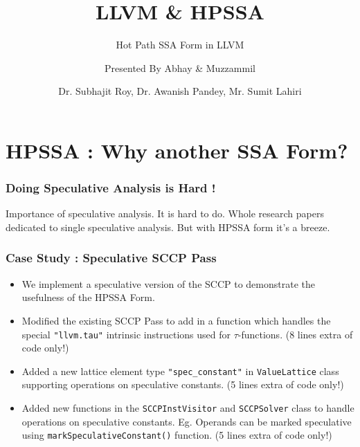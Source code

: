 \documentclass{beamer}
\title[\url{https://google.com}] %
{LLVM \& HPSSA}
\subtitle{Hot Path SSA Form in LLVM}
\author[VIP1 \& VIP2] %
{Presented By Abhay\inst{1} \& Muzzammil\inst{1}}
\institute[IDK] %
{
	\inst{1}%
	IIT Kanpur\\
	PRAISE Group
}
\date[01/03/2022] %
{Dr. Subhajit Roy, Dr. Awanish Pandey, Mr. Sumit Lahiri}
\begin{document}
\frame{\titlepage}

\footnotesize
\section{HPSSA : Why another SSA Form?}

\begin{frame}
	\frametitle{Doing Speculative Analysis is Hard !}
	Importance of speculative analysis. It is hard to do. Whole research papers dedicated to 
	single speculative analysis. But with HPSSA form it's a breeze.
\end{frame}
{
	
}
\begin{frame}
	\frametitle{Case Study : Speculative SCCP Pass}
	\begin{itemize}
		\item We implement a speculative version of the SCCP to demonstrate the usefulness of the HPSSA Form.
		\item Modified the existing SCCP Pass to add in a function which handles the special \texttt{"llvm.tau"} intrinsic instructions used for $\tau$-functions. \color{blue} (8 lines extra of code only!) \color{black}
		\item Added a new lattice element type \texttt{"spec_constant"} in \texttt{ValueLattice} class supporting operations on speculative constants. \color{blue} (5 lines extra of code only!) \color{black} 
		\item Added new functions in the \texttt{SCCPInstVisitor} and \texttt{SCCPSolver} class to handle operations on speculative constants. Eg. Operands can be marked speculative using \texttt{markSpeculativeConstant()} function. \color{blue} (5 lines extra of code only!) \color{black}
	\end{itemize}
\end{frame}
\end{document}
